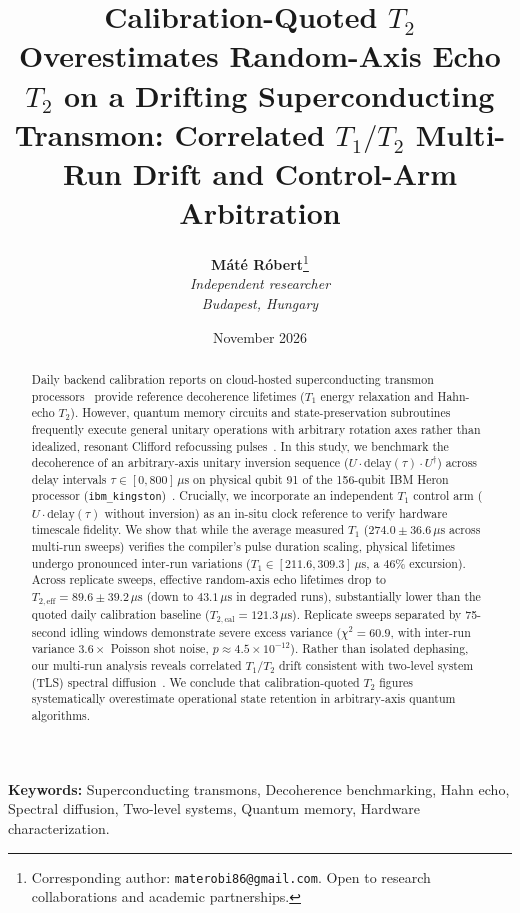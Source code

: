 \documentclass[11pt,a4paper]{article}
\title{\textbf{Calibration-Quoted $T_2$ Overestimates Random-Axis Echo $T_2$ on a Drifting Superconducting Transmon: Correlated $T_1/T_2$ Multi-Run Drift and Control-Arm Arbitration}}
\author{
  \textbf{M\'at\'e R\'obert}\thanks{Corresponding author: \texttt{materobi86@gmail.com}. Open to research collaborations and academic partnerships.}\\
  \textit{Independent researcher}\\
  \textit{Budapest, Hungary}
}
\date{November 2026}
\begin{document}
\maketitle

\begin{abstract}
Daily backend calibration reports on cloud-hosted superconducting transmon processors~\cite{krantz_guide,blais_cqed} provide reference decoherence lifetimes ($T_1$ energy relaxation and Hahn-echo $T_2$). However, quantum memory circuits and state-preservation subroutines frequently execute general unitary operations with arbitrary rotation axes rather than idealized, resonant Clifford refocussing pulses~\cite{hahn1950,carr_purcell1954}. In this study, we benchmark the decoherence of an arbitrary-axis unitary inversion sequence ($U \cdot \text{delay}(\tau) \cdot U^{\dagger}$) across delay intervals $\tau \in [0, 800]\,\mu\text{s}$ on physical qubit 91 of the 156-qubit IBM Heron processor (\texttt{ibm\_kingston})~\cite{heron2024}. Crucially, we incorporate an independent $T_1$ control arm ($U \cdot \text{delay}(\tau)$ without inversion) as an in-situ clock reference to verify hardware timescale fidelity. We show that while the average measured $T_1$ ($274.0 \pm 36.6\,\mu\text{s}$ across multi-run sweeps) verifies the compiler's pulse duration scaling, physical lifetimes undergo pronounced inter-run variations ($T_1 \in [211.6, 309.3]\,\mu\text{s}$, a $46\%$ excursion). Across replicate sweeps, effective random-axis echo lifetimes drop to $T_{2,\text{eff}} = 89.6 \pm 39.2\,\mu\text{s}$ (down to $43.1\,\mu\text{s}$ in degraded runs), substantially lower than the quoted daily calibration baseline ($T_{2,\text{cal}} = 121.3\,\mu\text{s}$). Replicate sweeps separated by 75-second idling windows demonstrate severe excess variance ($\chi^2 = 60.9$, with inter-run variance $3.6\times$ Poisson shot noise, $p \approx 4.5 \times 10^{-12}$). Rather than isolated dephasing, our multi-run analysis reveals correlated $T_1/T_2$ drift consistent with two-level system (TLS) spectral diffusion~\cite{burnett2019,muller2019tls}. We conclude that calibration-quoted $T_2$ figures systematically overestimate operational state retention in arbitrary-axis quantum algorithms.
\end{abstract}

\vspace{1em}
\noindent \textbf{Keywords:} Superconducting transmons, Decoherence benchmarking, Hahn echo, Spectral diffusion, Two-level systems, Quantum memory, Hardware characterization.
\end{document}
